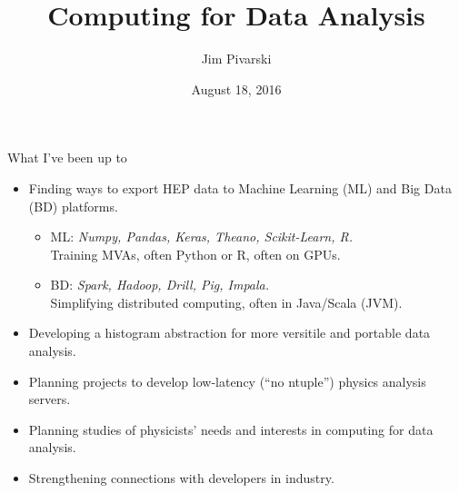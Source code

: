 \documentclass{beamer}
\title[2016-08-18-focus-group-advertisement]{Computing for Data Analysis}
\author{Jim Pivarski}
\institute{Princeton University -- DIANA}
\date{August 18, 2016}
\begin{document}

\begin{frame}
  \titlepage
\end{frame}



\begin{frame}{What I've been up to}
\vspace{0.5 cm}
\begin{itemize}\setlength{\itemsep}{0.25 cm}
\item Finding ways to export HEP data to Machine Learning (ML) and Big Data (BD) platforms.
\begin{itemize}
\item ML: {\it Numpy, Pandas, Keras, Theano, Scikit-Learn, R.} \\ Training MVAs, often Python or R, often on GPUs.
\item BD: {\it Spark, Hadoop, Drill, Pig, Impala.} \\ Simplifying distributed computing, often in Java/Scala (JVM).
\end{itemize}
\item Developing a histogram abstraction for more versitile and portable data analysis.
\item Planning projects to develop low-latency (``no ntuple'') physics analysis servers.
\item Planning studies of physicists' needs and interests in computing for data analysis.
\item Strengthening connections with developers in industry.
\end{itemize}
\end{frame}
\end{document}

